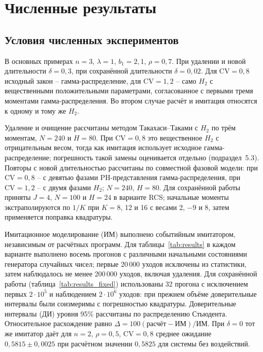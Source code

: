 \documentclass[a4paper,12pt]{article}
\begin{document}
\section{Численные результаты}\label{sec:results}
\subsection{Условия численных экспериментов}
В основных примерах \(n=3\), \(\lambda=1\), \(b_1=2{,}1\), \(\rho=0{,}7\). При удалении и новой длительности \(\delta=0{,}3\), при сохранённой длительности \(\delta=0{,}02\). Для \(\mathrm{CV}=0{,}8\) исходный закон -- гамма-распределение, для \(\mathrm{CV}=1{,}2\) -- само \(H_2\) с вещественными положительными параметрами, согласованное с первыми тремя моментами гамма-распределения. Во втором случае расчёт и имитация относятся к одному и тому же \(H_2\).

Удаление и очищение рассчитаны методом Такахаси--Таками с \(H_2\) по трём моментам, \(N=240\) и \(H=80\). При \(\mathrm{CV}=0{,}8\) это вещественное \(H_2\) с отрицательным весом, тогда как имитация использует исходное гамма-распределение; погрешность такой замены оценивается отдельно (подраздел~5.3). Повторы с новой длительностью рассчитаны по совместной фазовой модели: при \(\mathrm{CV}=0{,}8\) -- с девятью фазами PH-представления гамма-распределения, при \(\mathrm{CV}=1{,}2\) -- с двумя фазами \(H_2\); \(N=240\), \(H=80\). Для сохранённой работы приняты \(J=4\), \(N=100\) и \(H=24\) в варианте RCS; начальные моменты экстраполируются по \(1/K\) при \(K=8\), 12 и 16 с весами 2, \(-9\) и 8, затем применяется поправка квадратуры.

Имитационное моделирование (ИМ) выполнено событийным имитатором, независимым от расчётных программ. Для таблицы~\ref{tab:results} в каждом варианте выполнено восемь прогонов с различными начальными состояниями генератора случайных чисел; первые 20\,000 уходов исключены из статистики, затем наблюдалось не менее 200\,000 уходов, включая удаления. Для сохранённой работы (таблица~\ref{tab:results_fixed}) использованы 32 прогона с исключением первых \(2\cdot10^5\) и наблюдением \(2\cdot10^6\) уходов: при прежнем объёме доверительные интервалы были соизмеримы с погрешностью квадратуры. Доверительные интервалы (ДИ) уровня 95\% рассчитаны по распределению Стьюдента. Относительное расхождение равно \(\Delta=100(\text{расчёт}-\text{ИМ})/\text{ИМ}\). При \(\delta=0\) тот же имитатор даёт для \(n=2\), \(\rho=0{,}5\), \(\mathrm{CV}=0{,}8\) среднее ожидание \(0{,}5815\pm0{,}0025\) при расчётном значении \(0{,}5825\) для системы без воздействий.
\end{document}
